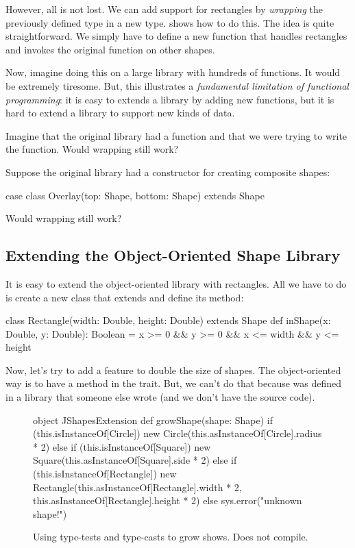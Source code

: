 \documentclass{book}
\begin{document}
However, all is not lost. We can add support for rectangles by \emph{wrapping}
the previously defined  type in a new type. 
shows how to do this. The idea is quite straightforward. We simply
have to define a new  function that handles rectangles
and invokes the original  function on other shapes.

Now, imagine doing this on a large library with hundreds of functions. It would
be extremely tiresome. But, this illustrates a \emph{fundamental limitation of
functional programming}: it is easy to extends a library by adding new
functions, but it is hard to extend a library to support new kinds of data.

\begin{think}
Imagine that the original library had a  function
and that we were trying to write the  function.
Would wrapping still work?

Suppose the original library had a constructor for creating composite
shapes:
\begin{scalacode}
case class Overlay(top: Shape, bottom: Shape) extends Shape
\end{scalacode}
Would wrapping still work?
\end{think}

\subsection{Extending the Object-Oriented Shape Library}

It is easy to extend the object-oriented library with rectangles. All we
have to do is create a new class that extends 
and define its  method:
%
\begin{scalacode}
class Rectangle(width: Double, height: Double) extends Shape {
  def inShape(x: Double, y: Double): Boolean = x >= 0 && y >= 0 && x <= width && y <= height
}
\end{scalacode}

Now, let's try to add a feature to double the size of shapes. The object-oriented
way is to have a  method in the 
trait. But, we can't do that because  was defined in
a library that someone else wrote (and we don't have the source code).

\begin{figure}
\begin{scalacode}
object JShapesExtension {
  def growShape(shape: Shape) {
    if (this.isInstanceOf[Circle]) {
      new Circle(this.asInstanceOf[Circle].radius * 2)
    }
    else if (this.isInstanceOf[Square]) {
      new Square(this.asInstanceOf[Square].side * 2)
    }
    else if (this.isInstanceOf[Rectangle]) {
      new Rectangle(this.asInstanceOf[Rectangle].width * 2, this.asInstanceOf[Rectangle].height * 2)
    }
    else {
      sys.error("unknown shape!")
    }
  }
}
\end{scalacode}
\caption{Using type-tests and type-casts to grow shows. Does not compile.}
\label{jshapesext1}
\end{figure}
\end{document}
